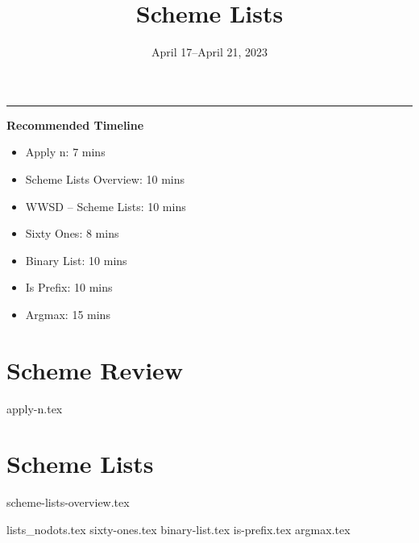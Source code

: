 \documentclass{exam}
\title{Scheme Lists}
\date{April 17--April 21, 2023}
\begin{document}
\maketitle\rule{\textwidth}{0.15em}

\begin{meta}
    \begin{blocksection}
        \textbf{Recommended Timeline}
        \begin{itemize}
            \item Apply n: 7 mins
            \item Scheme Lists Overview: 10 mins
            \item WWSD -- Scheme Lists: 10 mins
            \item Sixty Ones: 8 mins
            \item Binary List: 10 mins
            \item Is Prefix: 10 mins
            \item Argmax: 15 mins
        \end{itemize}
    \end{blocksection}
\end{meta}

\section{Scheme Review}
\begin{questions}
    {apply-n.tex}
\end{questions}

\section{Scheme Lists}
{scheme-lists-overview.tex}
\newpage
\begin{questions}
{lists_nodots.tex}
{sixty-ones.tex}
{binary-list.tex}
{is-prefix.tex}
{argmax.tex} 
\end{questions}
\end{document}
